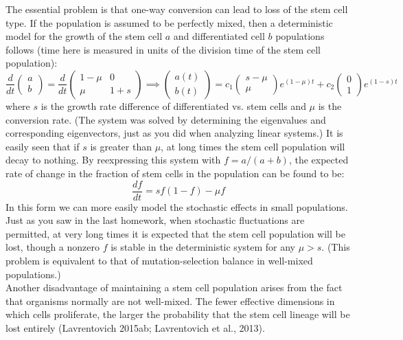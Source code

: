 \documentclass{article}
\begin{document}
The essential problem is that one-way conversion can lead to loss of the stem cell type. If the population is assumed to be perfectly mixed, then a deterministic model for the growth of the stem cell $a$ and differentiated cell $b$ populations follows (time here is measured in units of the division time of the stem cell population):
\[ \frac{d}{dt} \begin{pmatrix} a \\ b \end{pmatrix} = \frac{d}{dt} \begin{pmatrix} 1 - \mu & 0 \\ \mu & 1 + s \end{pmatrix}  \implies \begin{pmatrix} a(t) \\ b(t) \end{pmatrix} = c_1 \begin{pmatrix} s - \mu \\ \mu \end{pmatrix} e^{(1-\mu)t} + c_2 \begin{pmatrix} 0 \\ 1 \end{pmatrix} e^{(1-s)t} \]
where $s$ is the growth rate difference of differentiated vs. stem cells and $\mu$ is the conversion rate. (The system was solved by determining the eigenvalues and corresponding eigenvectors, just as you did when analyzing linear systems.) It is easily seen that if $s$ is greater than $\mu$, at long times the stem cell population will decay to nothing. By reexpressing this system with $f=a/(a+b)$, the expected rate of change in the fraction of stem cells in the population can be found to be:
\[ \frac{df}{dt} = sf(1-f) - \mu f \]
In this form we can more easily model the stochastic effects in small populations. Just as you saw in the last homework, when stochastic fluctuations are permitted, at very long times it is expected that the stem cell population will be lost, though a nonzero $f$ is stable in the deterministic system for any $\mu > s$. (This problem is equivalent to that of mutation-selection balance in well-mixed populations.)\\

Another disadvantage of maintaining a stem cell population arises from the fact that organisms normally are not well-mixed. The fewer effective dimensions in which cells proliferate, the larger the probability that the stem cell lineage will be lost entirely (Lavrentovich 2015ab; Lavrentovich et al., 2013).
\end{document}
